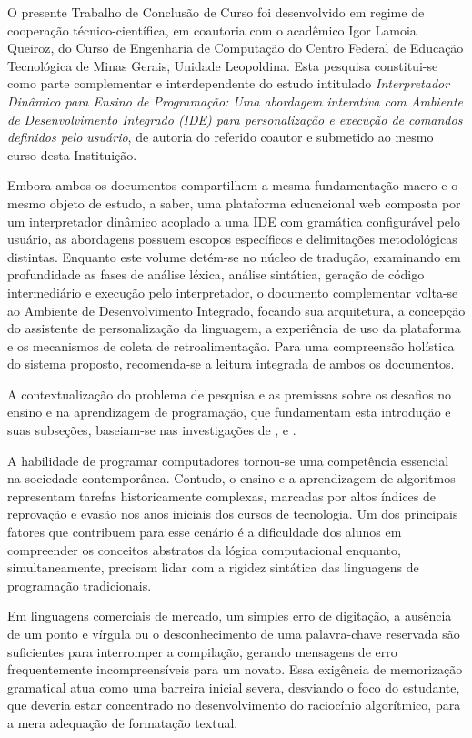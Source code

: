 \label{cap:introducao_modelo}

O presente Trabalho de Conclusão de Curso foi desenvolvido em regime de cooperação técnico-científica, em coautoria com o acadêmico Igor Lamoia Queiroz, do Curso de Engenharia de Computação do Centro Federal de Educação Tecnológica de Minas Gerais, Unidade Leopoldina. Esta pesquisa constitui-se como parte complementar e interdependente do estudo intitulado \textit{Interpretador Dinâmico para Ensino de Programação: Uma abordagem interativa com Ambiente de Desenvolvimento Integrado (IDE) para personalização e execução de comandos definidos pelo usuário}, de autoria do referido coautor e submetido ao mesmo curso desta Instituição.

Embora ambos os documentos compartilhem a mesma fundamentação macro e o mesmo objeto de estudo, a saber, uma plataforma educacional web composta por um interpretador dinâmico acoplado a uma IDE com gramática configurável pelo usuário, as abordagens possuem escopos específicos e delimitações metodológicas distintas. Enquanto este volume detém-se no núcleo de tradução, examinando em profundidade as fases de análise léxica, análise sintática, geração de código intermediário e execução pelo interpretador, o documento complementar volta-se ao Ambiente de Desenvolvimento Integrado, focando sua arquitetura, a concepção do assistente de personalização da linguagem, a experiência de uso da plataforma e os mecanismos de coleta de retroalimentação. Para uma compreensão holística do sistema proposto, recomenda-se a leitura integrada de ambos os documentos.

A contextualização do problema de pesquisa e as premissas sobre os desafios no ensino e na aprendizagem de programação, que fundamentam esta introdução e suas subseções, baseiam-se nas investigações de ,  e .

A habilidade de programar computadores tornou-se uma competência essencial na sociedade contemporânea. Contudo, o ensino e a aprendizagem de algoritmos representam tarefas historicamente complexas, marcadas por altos índices de reprovação e evasão nos anos iniciais dos cursos de tecnologia. Um dos principais fatores que contribuem para esse cenário é a dificuldade dos alunos em compreender os conceitos abstratos da lógica computacional enquanto, simultaneamente, precisam lidar com a rigidez sintática das linguagens de programação tradicionais.

Em linguagens comerciais de mercado, um simples erro de digitação, a ausência de um ponto e vírgula ou o desconhecimento de uma palavra-chave reservada são suficientes para interromper a compilação, gerando mensagens de erro frequentemente incompreensíveis para um novato. Essa exigência de memorização gramatical atua como uma barreira inicial severa, desviando o foco do estudante, que deveria estar concentrado no desenvolvimento do raciocínio algorítmico, para a mera adequação de formatação textual.

